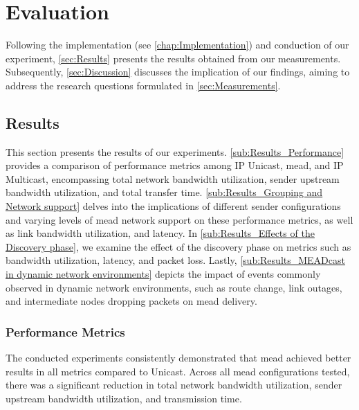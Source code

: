 \chapter{Evaluation} %
\label{chap:Evaluation}
Following the implementation (see \autoref{chap:Implementation}) and conduction
    of our experiment, \autoref{sec:Results} presents the results obtained from
    our measurements.
Subsequently, \autoref{sec:Discussion} discusses the implication of our
    findings, aiming to address the research questions formulated in
    \autoref{sec:Measurements}.

\section{Results} %
\label{sec:Results}
This section presents the results of our experiments.
\autoref{sub:Results_Performance} provides a comparison of performance metrics
    among IP Unicast, \gls{mead}, and IP Multicast, encompassing total network
    bandwidth utilization, sender upstream bandwidth utilization, and total
    transfer time.
\autoref{sub:Results_Grouping and Network support} delves into the implications
    of different sender configurations and varying levels of \gls{mead} network
    support on these performance metrics, as well as link bandwidth
    utilization, and latency.
In \autoref{sub:Results_Effects of the Discovery phase}, we examine the effect
    of the discovery phase on metrics such as bandwidth utilization, latency,
    and packet loss.
Lastly, \autoref{sub:Results_MEADcast in dynamic network environments} depicts
    the impact of events commonly observed in dynamic network environments,
    such as route change, link outages, and intermediate nodes dropping packets
    on \gls{mead} delivery.
\subsection{Performance Metrics} %
\label{sub:Results_Performance}
The conducted experiments consistently demonstrated that \gls{mead} achieved
    better results in all metrics compared to Unicast.
Across all \gls{mead} configurations tested, there was a significant reduction in
    total network bandwidth utilization, sender upstream bandwidth utilization,
    and transmission time.

